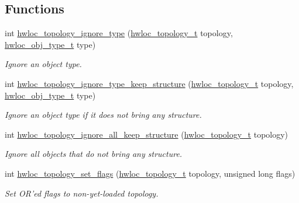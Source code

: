\subsection*{Functions}
\begin{DoxyCompactItemize}
\item 
int \hyperlink{group__hwlocality__configuration_gafcf30842e8cb47b4c3dcaebecea31e17}{hwloc\_\-topology\_\-ignore\_\-type} (\hyperlink{group__hwlocality__topology_ga9d1e76ee15a7dee158b786c30b6a6e38}{hwloc\_\-topology\_\-t} topology, \hyperlink{group__hwlocality__types_gacd37bb612667dc437d66bfb175a8dc55}{hwloc\_\-obj\_\-type\_\-t} type)
\begin{DoxyCompactList}\small\item\em Ignore an object type. \item\end{DoxyCompactList}\item 
int \hyperlink{group__hwlocality__configuration_ga1f987bca941d6949faf7b1554dd7bc12}{hwloc\_\-topology\_\-ignore\_\-type\_\-keep\_\-structure} (\hyperlink{group__hwlocality__topology_ga9d1e76ee15a7dee158b786c30b6a6e38}{hwloc\_\-topology\_\-t} topology, \hyperlink{group__hwlocality__types_gacd37bb612667dc437d66bfb175a8dc55}{hwloc\_\-obj\_\-type\_\-t} type)
\begin{DoxyCompactList}\small\item\em Ignore an object type if it does not bring any structure. \item\end{DoxyCompactList}\item 
int \hyperlink{group__hwlocality__configuration_ga7c9cf147442d65d755c664ccde3bb3ef}{hwloc\_\-topology\_\-ignore\_\-all\_\-keep\_\-structure} (\hyperlink{group__hwlocality__topology_ga9d1e76ee15a7dee158b786c30b6a6e38}{hwloc\_\-topology\_\-t} topology)
\begin{DoxyCompactList}\small\item\em Ignore all objects that do not bring any structure. \item\end{DoxyCompactList}\item 
int \hyperlink{group__hwlocality__configuration_gaaeed4df656979e5f16befea9d29b814b}{hwloc\_\-topology\_\-set\_\-flags} (\hyperlink{group__hwlocality__topology_ga9d1e76ee15a7dee158b786c30b6a6e38}{hwloc\_\-topology\_\-t} topology, unsigned long flags)
\begin{DoxyCompactList}\small\item\em Set OR'ed flags to non-\/yet-\/loaded topology. \item\end{DoxyCompactList}\item 

\end{DoxyCompactItemize}
